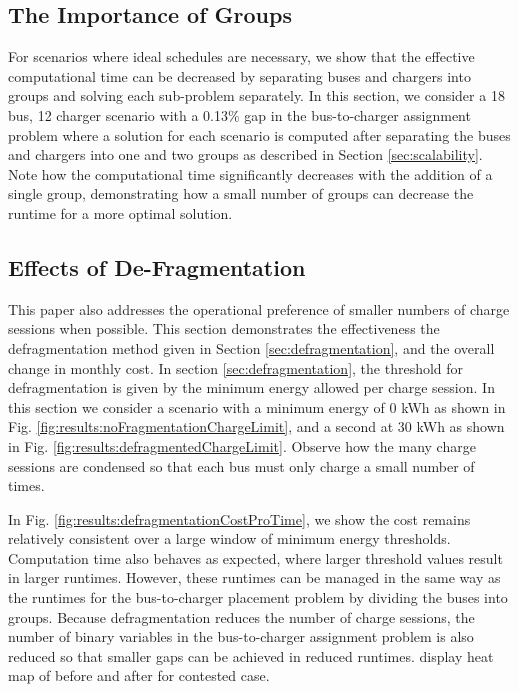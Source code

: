 \subsection{The Importance of Groups}
For scenarios where ideal schedules are necessary, we show that the effective computational time can be decreased by separating buses and chargers into groups and solving each sub-problem separately. In this section, we consider a 18 bus, 12 charger scenario with a 0.13\% gap in the bus-to-charger assignment problem where a solution for each scenario is computed after separating the buses and chargers into one and two groups as described in Section \ref{sec:scalability}. Note how the computational time significantly decreases with the addition of a single group, demonstrating how a small number of groups can decrease the runtime for a more optimal solution.
 
\subsection{Effects of De-Fragmentation}
This paper also addresses the operational preference of smaller numbers of charge sessions when possible. This section demonstrates the effectiveness the defragmentation method given in Section \ref{sec:defragmentation}, and the overall change in monthly cost. In section \ref{sec:defragmentation}, the threshold for defragmentation is given by the minimum energy allowed per charge session. In this section we consider a scenario with a minimum energy of 0 kWh as shown in Fig. \ref{fig:results:noFragmentationChargeLimit}, and a second at 30 kWh as shown in Fig. \ref{fig:results:defragmentedChargeLimit}. Observe how the many charge sessions are condensed so that each bus must only charge a small number of times. 
\par In Fig. \ref{fig:results:defragmentationCostProTime}, we show the cost remains relatively consistent over a large window of minimum energy thresholds. Computation time also behaves as expected, where larger threshold values result in larger runtimes. However, these runtimes can be managed in the same way as the runtimes for the bus-to-charger placement problem by dividing the buses into groups. Because defragmentation reduces the number of charge sessions, the number of binary variables in the bus-to-charger assignment problem is also reduced so that smaller gaps can be achieved in reduced runtimes.
display heat map of before and after for contested case. 

 


